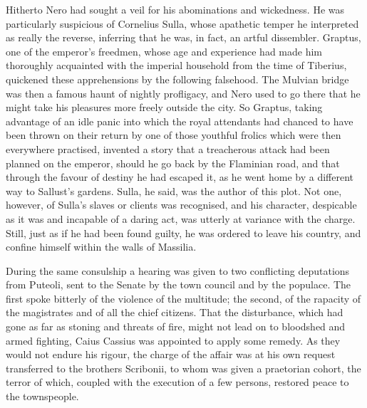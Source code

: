 
Hitherto Nero had sought a veil for his abominations and wickedness. He was particularly suspicious of Cornelius Sulla, whose apathetic temper he interpreted as really the reverse, inferring that he was, in fact, an artful dissembler. Graptus, one of the emperor's freedmen, whose age and experience had made him thoroughly acquainted with the imperial household from the time of Tiberius, quickened these apprehensions by the following falsehood. The Mulvian bridge was then a famous haunt of nightly profligacy, and Nero used to go there that he might take his pleasures more freely outside the city. So Graptus, taking advantage of an idle panic into which the royal attendants had chanced to have been thrown on their return by one of those youthful frolics which were then everywhere practised, invented a story that a treacherous attack had been planned on the emperor, should he go back by the Flaminian road, and that through the favour of destiny he had escaped it, as he went home by a different way to Sallust's gardens. Sulla, he said, was the author of this plot. Not one, however, of Sulla's slaves or clients was recognised, and his character, despicable as it was and incapable of a daring act, was utterly at variance with the charge. Still, just as if he had been found guilty, he was ordered to leave his country, and confine himself within the walls of Massilia.


During the same consulship a hearing was given to two conflicting deputations from Puteoli, sent to the Senate by the town council and by the populace. The first spoke bitterly of the violence of the multitude; the second, of the rapacity of the magistrates and of all the chief citizens. That the disturbance, which had gone as far as stoning and threats of fire, might not lead on to bloodshed and armed fighting, Caius Cassius was appointed to apply some remedy. As they would not endure his rigour, the charge of the affair was at his own request transferred to the brothers Scribonii, to whom was given a praetorian cohort, the terror of which, coupled with the execution of a few persons, restored peace to the townspeople.


